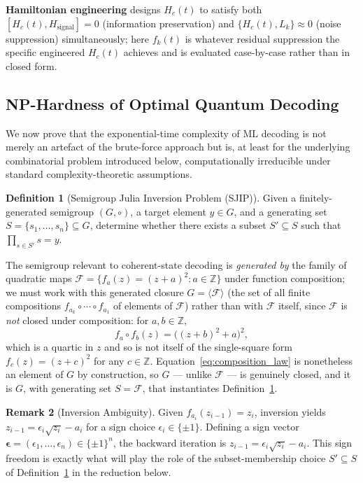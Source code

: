 \documentclass[journal,twocolumn]{IEEEtran}
\theoremstyle{definition}
\newtheorem{definition}{Definition}[section]
\newtheorem{remark}[definition]{Remark}
\theoremstyle{plain}
\newcommand{\Z}{\mathbb{Z}}
\begin{document}
\textbf{Hamiltonian engineering} designs $H_c(t)$ to satisfy both
$[H_c(t), H_{\mathrm{signal}}] = 0$ (information preservation)
and $\{H_c(t), L_k\} \approx 0$ (noise suppression) simultaneously;
here $f_k(t)$ is whatever residual suppression the specific
engineered $H_c(t)$ achieves and is evaluated case-by-case rather
than in closed form.

\subsection{NP-Hardness of Optimal Quantum Decoding}
\label{sec:sjip}

We now prove that the exponential-time complexity of ML decoding is
not merely an artefact of the brute-force approach but is, at least
for the underlying combinatorial problem introduced below,
computationally irreducible under standard complexity-theoretic
assumptions.

\begin{definition}[Semigroup Julia Inversion Problem (SJIP)]
\label{def:sjip}
Given a finitely-generated semigroup $(G,\circ)$, a target element
$y \in G$, and a generating set $S = \{s_1, \ldots, s_n\} \subseteq G$,
determine whether there exists a subset $S' \subseteq S$ such that
$\prod_{s \in S'} s = y$.
\end{definition}

The semigroup relevant to coherent-state decoding is \emph{generated
by} the family of quadratic maps $\mathcal{F} = \{f_a(z) = (z+a)^2 :
a \in \Z\}$ under function composition; we must work with this
generated closure $G = \langle\mathcal{F}\rangle$ (the set of all
finite compositions $f_{a_k}\circ\cdots\circ f_{a_1}$ of elements of
$\mathcal F$) rather than with $\mathcal F$ itself, since $\mathcal
F$ is \emph{not} closed under composition: for $a,b\in\Z$,
\begin{equation}
  f_a \circ f_b(z) = \bigl((z+b)^2 + a\bigr)^2,
  \label{eq:composition_law}
\end{equation}
which is a quartic in $z$ and so is not itself of the single-square
form $f_c(z) = (z+c)^2$ for any $c\in\Z$. Equation~\eqref{eq:composition_law}
is nonetheless an element of $G$ by construction, so $G$ --- unlike
$\mathcal F$ --- is genuinely closed, and it is $G$, with generating
set $S = \mathcal F$, that instantiates Definition~\ref{def:sjip}.

\begin{remark}[Inversion Ambiguity]
\label{lem:inversion}
Given $f_{a_i}(z_{i-1}) = z_i$, inversion yields
$z_{i-1} = \epsilon_i \sqrt{z_i} - a_i$ for a sign choice
$\epsilon_i \in \{\pm 1\}$.  Defining a sign vector
$\boldsymbol\epsilon = (\epsilon_1, \ldots, \epsilon_n) \in
\{\pm1\}^n$, the backward iteration is
$z_{i-1} = \epsilon_i\sqrt{z_i} - a_i$.  This sign freedom is exactly
what will play the role of the subset-membership choice $S'\subseteq
S$ of Definition~\ref{def:sjip} in the reduction below.
\end{remark}
\end{document}
